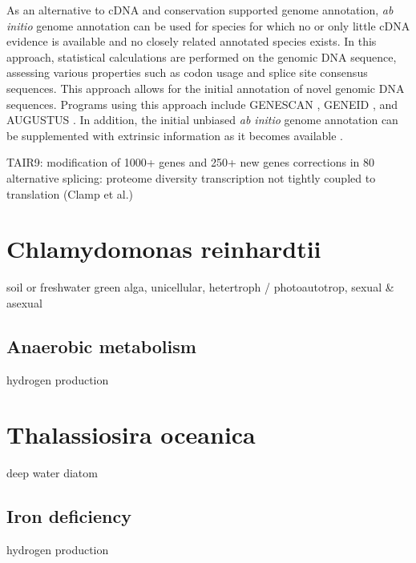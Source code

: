 As an alternative to cDNA and conservation supported genome annotation,
{\em ab initio} genome annotation can be used for species for which no
or only little cDNA evidence is available and no closely related annotated
species exists.
In this approach, statistical calculations are performed on the genomic
DNA sequence, assessing various properties such as codon usage and splice 
site consensus sequences.
This approach allows for the initial annotation of novel genomic DNA 
sequences.
Programs using this approach include GENESCAN \citep{Burge1997}, 
GENEID \citep{Parra2000}, and AUGUSTUS \citep{Stanke2004, Stanke2006}.
In addition, the initial unbiased {\em ab initio} genome annotation can be 
supplemented with extrinsic information as it becomes available 
\citep{Stanke2008}.

\begin{todo}
TAIR9: modification of 1000+ genes and 250+ new genes
corrections in 80%
alternative splicing: proteome diversity
transcription not tightly coupled to translation (Clamp et al.)
\end{todo}

\section{Chlamydomonas reinhardtii}

\begin{todo}
soil or freshwater green alga, unicellular, hetertroph / photoautotrop, sexual & asexual
\end{todo}

\subsection{Anaerobic metabolism}

\begin{todo}
hydrogen production
\end{todo}

\section{Thalassiosira oceanica}

\begin{todo}
deep water diatom
\end{todo}

\subsection{Iron deficiency}

\begin{todo}
hydrogen production
\end{todo}
